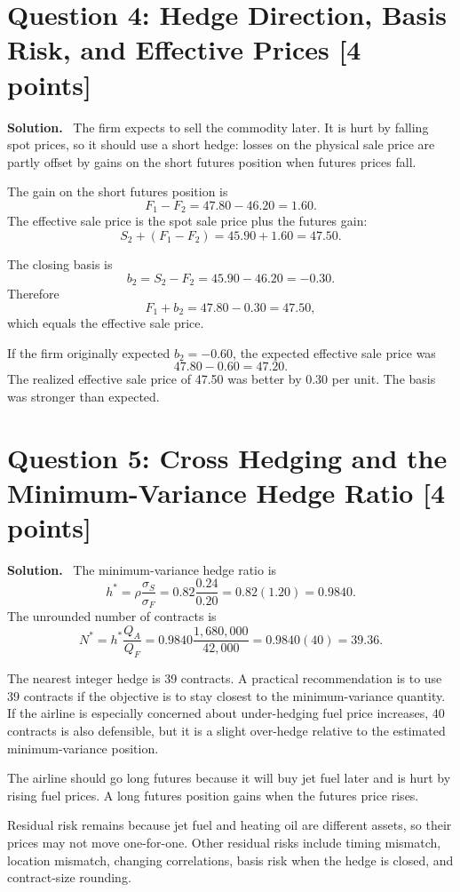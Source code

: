 \documentclass[11pt]{article}
\newcommand{\pts}[1]{\hspace{0.35em}\textnormal{\textbf{[#1 points]}}}
\newcommand{\Fone}{F_1}
\newcommand{\Ftwo}{F_2}
\newenvironment{solution}{\par\noindent\textbf{Solution.}\ }{\par}
\begin{document}
\section*{Question 4: Hedge Direction, Basis Risk, and Effective Prices \pts{4}}

\begin{solution}
The firm expects to sell the commodity later. It is hurt by falling spot prices,
so it should use a short hedge: losses on the physical sale price are partly
offset by gains on the short futures position when futures prices fall.

The gain on the short futures position is
\[
    \Fone-\Ftwo=47.80-46.20=1.60.
\]
The effective sale price is the spot sale price plus the futures gain:
\[
    S_2+(\Fone-\Ftwo)=45.90+1.60=47.50.
\]

The closing basis is
\[
    b_2=S_2-\Ftwo=45.90-46.20=-0.30.
\]
Therefore
\[
    \Fone+b_2=47.80-0.30=47.50,
\]
which equals the effective sale price.

If the firm originally expected $b_2=-0.60$, the expected effective sale price
was
\[
    47.80-0.60=47.20.
\]
The realized effective sale price of 47.50 was better by 0.30 per unit. The
basis was stronger than expected.
\end{solution}

\section*{Question 5: Cross Hedging and the Minimum-Variance Hedge Ratio \pts{4}}

\begin{solution}
The minimum-variance hedge ratio is
\[
    h^*=\rho\frac{\sigma_S}{\sigma_F}
    =0.82\frac{0.24}{0.20}
    =0.82(1.20)
    =0.9840.
\]
The unrounded number of contracts is
\[
    N^*=h^*\frac{Q_A}{Q_F}
    =0.9840\frac{1{,}680{,}000}{42{,}000}
    =0.9840(40)
    =39.36.
\]

The nearest integer hedge is 39 contracts. A practical recommendation is to use
39 contracts if the objective is to stay closest to the minimum-variance
quantity. If the airline is especially concerned about under-hedging fuel price
increases, 40 contracts is also defensible, but it is a slight over-hedge
relative to the estimated minimum-variance position.

The airline should go long futures because it will buy jet fuel later and is
hurt by rising fuel prices. A long futures position gains when the futures price
rises.

Residual risk remains because jet fuel and heating oil are different assets, so
their prices may not move one-for-one. Other residual risks include timing
mismatch, location mismatch, changing correlations, basis risk when the hedge is
closed, and contract-size rounding.
\end{solution}
\end{document}
